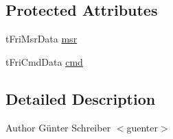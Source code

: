 \subsection*{\-Protected \-Attributes}
\begin{DoxyCompactItemize}
\item 
t\-Fri\-Msr\-Data \hyperlink{classfriRemote_ab51535cd4f2d3828e87f03d3aa115346}{msr}
\item 
t\-Fri\-Cmd\-Data \hyperlink{classfriRemote_a81bc40f676de878e6a5e4c7382462e15}{cmd}
\end{DoxyCompactItemize}


\subsection{\-Detailed \-Description}
\begin{DoxyAuthor}{\-Author}
\-Günter \-Schreiber $<$guenter$>$ 
\end{DoxyAuthor}


